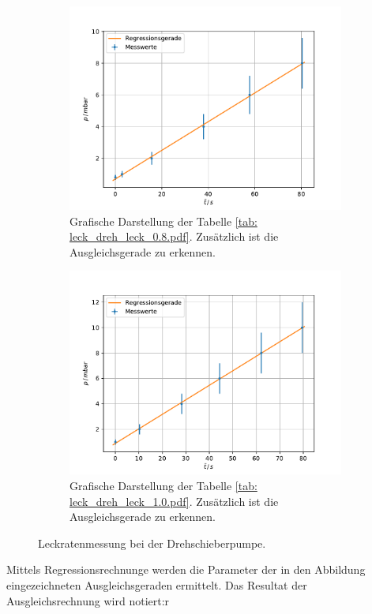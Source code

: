 \begin{figure}
    \centering
    \begin{subfigure}{0.4\textwidth}
        \centering
        \includegraphics[width=1\textwidth]{../Messdaten/plots/dreh/leckrate_dreh_08.pdf}
        \caption{Grafische Darstellung der Tabelle \ref{tab: leck_dreh_leck_0.8.pdf}. Zusätzlich ist die Ausgleichsgerade zu erkennen.}
        \label{fig: drehs_leck_1}
    \end{subfigure}
    \begin{subfigure}{0.4\textwidth}
        \centering
        \includegraphics[width=1\textwidth]{../Messdaten/plots/dreh/leckrate_dreh_10.pdf}
        \caption{Grafische Darstellung der Tabelle \ref{tab: leck_dreh_leck_1.0.pdf}. Zusätzlich ist die Ausgleichsgerade zu erkennen.}
    \end{subfigure}
    \caption{Leckratenmessung bei der Drehschieberpumpe.}
      \label{fig: leck_dreh_2}
\end{figure}
Mittels Regressionsrechnunge werden die Parameter der in den Abbildung eingezeichneten Ausgleichsgeraden ermittelt.
Das Resultat der Ausgleichsrechnung wird notiert:r

